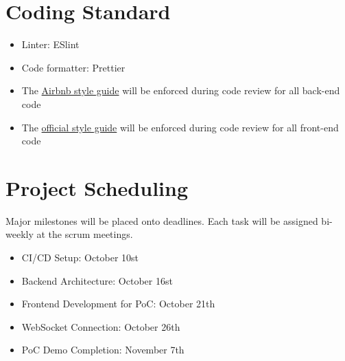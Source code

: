 \documentclass{article}
\begin{document}
\section{Coding Standard}

\begin{itemize}
    \item Linter: ESlint
    \item Code formatter: Prettier
    \item The \href{https://github.com/airbnb/javascript}{Airbnb style guide} will be enforced during code review for all back-end code
    \item The \href{https://angular.io/guide/styleguide}{official style guide} will be enforced during code review for all front-end code
\end{itemize}

\section{Project Scheduling}

Major milestones will be placed onto deadlines. Each task will be assigned bi-weekly at the scrum meetings.

\begin{itemize} 
    \item CI/CD Setup: October 10st
    \item Backend Architecture: October 16st
    \item Frontend Development for PoC: October 21th
    \item WebSocket Connection: October 26th
    \item PoC Demo Completion: November 7th
\end{itemize}
\end{document}
